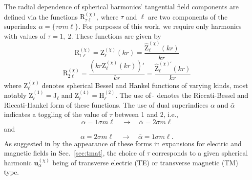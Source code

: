\documentclass[article]{IEEEtran}
\newcommand{\T}[1]{\mathrm{#1}}
\newcommand{\V}[1]{\boldsymbol{#1}}
\newcommand{\rbkind}{\chi}
\begin{document}
The radial dependence of spherical harmonics' tangential field components are defined via the functions $\T{R}_{\tau\ell}^{(\rbkind)}$, where $\tau$ and $\ell$ are two components of the superindex $\alpha = \{\tau\sigma m\ell\}$.  For purposes of this work, we require only harmonics with values of $\tau = 1,~2$.  These functions are given by 
\begin{equation}
    \T{R}_{1\ell}^{(\rbkind)} = \T{Z}_\ell^{(\rbkind)}(kr) = \frac{\hat{\T{Z}}_\ell^{(\rbkind)}(kr)}{kr}
\end{equation}
\begin{equation}
    \T{R}_{2\ell}^{(\rbkind)} = \frac{(kr\T{Z}_\ell^{(\rbkind)}(kr))'}{kr} = \frac{\hat{\T{Z}}_\ell^{(\rbkind)\prime}(kr)}{kr}
\end{equation}
where $\T{Z}_\ell^{(\rbkind)}$ denotes spherical Bessel and Hankel functions of varying kinds, most notably $\T{Z}_\ell^{(1)} = \T{J}_\ell$ and $\T{Z}_\ell^{(4)} = \T{H}^{(2)}_\ell$.  The use of $\hat{~}$ denotes the Riccati-Bessel and Riccati-Hankel form of these functions. 
The use of dual superindices $\alpha$ and $\bar{\alpha}$ indicates a toggling of the value of $\tau$ between 1 and 2, i.e.,
\begin{equation}
    \alpha = {1\sigma m \ell}\quad \rightarrow \quad \bar{\alpha} = {2\sigma m \ell} 
\end{equation}
and
\begin{equation}
    \alpha = {2\sigma m \ell}\quad \rightarrow \quad \bar{\alpha} = {1\sigma m \ell} .
\end{equation}
As suggested in by the appearance of these forms in expansions for electric and magnetic fields in Sec.~\ref{sec:tmat}, the choice of $\tau$ corresponds to a given spherical harmonic $\V{u}_\alpha^{(\rbkind)}$ being of transverse electric (TE) or transverse magnetic (TM) type.
\end{document}
